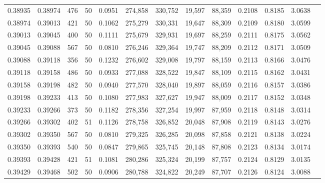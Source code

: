 \begin{tabular}{rrrrrrrrrrrrr}
0.38935 & 0.38974 &   476 &  50 &                                     0.0951 & 274,858 & 330,752 &  19,597 &  88,359 & 0.2108 & 0.8185 & 3.0638 \\
0.38974 & 0.39013 &   421 &  50 &                                     0.1062 & 275,279 & 330,331 &  19,647 &  88,309 & 0.2109 & 0.8180 & 3.0599 \\
0.39013 & 0.39045 &   400 &  50 &                                     0.1111 & 275,679 & 329,931 &  19,697 &  88,259 & 0.2111 & 0.8175 & 3.0562 \\
0.39045 & 0.39088 &   567 &  50 &                                     0.0810 & 276,246 & 329,364 &  19,747 &  88,209 & 0.2112 & 0.8171 & 3.0509 \\
0.39088 & 0.39118 &   356 &  50 &                                     0.1232 & 276,602 & 329,008 &  19,797 &  88,159 & 0.2113 & 0.8166 & 3.0476 \\
0.39118 & 0.39158 &   486 &  50 &                                     0.0933 & 277,088 & 328,522 &  19,847 &  88,109 & 0.2115 & 0.8162 & 3.0431 \\
0.39158 & 0.39198 &   482 &  50 &                                     0.0940 & 277,570 & 328,040 &  19,897 &  88,059 & 0.2116 & 0.8157 & 3.0386 \\
0.39198 & 0.39233 &   413 &  50 &                                     0.1080 & 277,983 & 327,627 &  19,947 &  88,009 & 0.2117 & 0.8152 & 3.0348 \\
0.39233 & 0.39266 &   373 &  50 &                                     0.1182 & 278,356 & 327,254 &  19,997 &  87,959 & 0.2118 & 0.8148 & 3.0314 \\
0.39266 & 0.39302 &   402 &  51 &                                     0.1126 & 278,758 & 326,852 &  20,048 &  87,908 & 0.2119 & 0.8143 & 3.0276 \\
0.39302 & 0.39350 &   567 &  50 &                                     0.0810 & 279,325 & 326,285 &  20,098 &  87,858 & 0.2121 & 0.8138 & 3.0224 \\
0.39350 & 0.39393 &   540 &  50 &                                     0.0847 & 279,865 & 325,745 &  20,148 &  87,808 & 0.2123 & 0.8134 & 3.0174 \\
0.39393 & 0.39428 &   421 &  51 &                                     0.1081 & 280,286 & 325,324 &  20,199 &  87,757 & 0.2124 & 0.8129 & 3.0135 \\
0.39429 & 0.39468 &   502 &  50 &                                     0.0906 & 280,788 & 324,822 &  20,249 &  87,707 & 0.2126 & 0.8124 & 3.0088 \\

\end{tabular}
